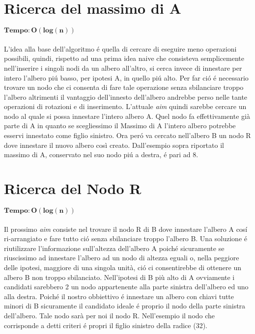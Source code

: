 \section{Ricerca del massimo di A}
$\mathbf{Tempo: O(log(n))}$\\ 	\\
L'idea alla base dell'algoritmo \'e quella di cercare di eseguire meno operazioni possibili, quindi, rispetto ad una prima idea naive che consisteva semplicemente nell'inserire i singoli nodi da un albero all'altro, si cerca invece di innestare per intero l'albero pi\'u basso, per ipotesi A, in quello pi\'u alto.
Per far ci\'o \'e necessario trovare un nodo che ci consenta di fare tale operazione senza sbilanciare troppo l'albero altrimenti il vantaggio dell'innesto dell'albero andrebbe perso nelle tante operazioni di rotazioni e di inserimento. L'attuale \emph{aim} quindi sarebbe cercare un nodo al quale si possa innestare l'intero albero A. Quel nodo fa effettivamente già parte di A in quanto se scegliessimo il Massimo di A l'intero albero potrebbe esservi innestato come figlio sinistro. Ora per\'o va cercato nell'albero B un nodo R dove innestare il nuovo albero così creato.
Dall'esempio sopra riportato il massimo di A, conservato nel suo nodo pi\'u a destra, \'e pari ad 8.

\section{Ricerca del Nodo R}
$\mathbf{Tempo: O(log(n))}$\\ 	\\
Il prossimo \emph{aim} consiste nel trovare il nodo R di B dove innestare l'albero A cos\'i ri-arrangiato e fare tutto ci\'o senza sbilanciare troppo l'albero B. Una soluzione \'e riutilizzare l'informazione sull'altezza dell'albero A poich\'e sicuramente se riuscissimo ad innestare l'albero ad un nodo di altezza eguali o, nella peggiore delle ipotesi, maggiore di una singola unità,  ci\'o ci consentirebbe di  ottenere un albero B non troppo sbilanciato. Nell'ipotesi di B più alto di A ovviamente i candidati sarebbero 2 un nodo appartenente alla parte sinistra dell'albero ed uno alla destra. Poich\'e il nostro obbiettivo \'e innestare un albero con chiavi tutte minori di B sicuramente il candidato ideale \'e proprio il nodo della parte sinistra dell'albero. Tale nodo sarà per noi il nodo R. Nell'esempio il nodo che corrisponde a detti criteri \'e propri il figlio sinistro della radice (32).
